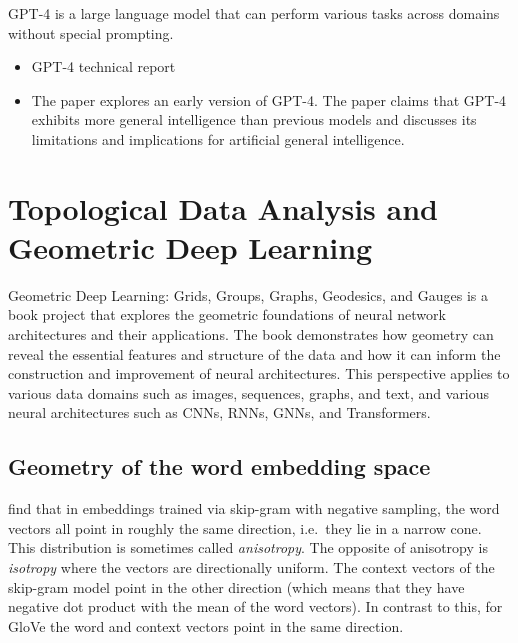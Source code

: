 \documentclass[11pt, a4paper]{amsart}
\begin{document}
GPT-4 is a large language model that can perform various tasks across domains without special prompting.

\begin{itemize}
	\item GPT-4 technical report \cite{openai2023gpt4}
	\item The paper \cite{bubeck2023sparks} explores an early version of GPT-4.
	The paper claims that GPT-4 exhibits more general intelligence than previous models and discusses its limitations and implications for artificial general intelligence.
\end{itemize}


\section{Topological Data Analysis and Geometric Deep Learning}

Geometric Deep Learning: Grids, Groups, Graphs, Geodesics, and Gauges is a book project \cite{bronstein2021geometric} that explores the geometric foundations of neural network architectures and their applications.
The book demonstrates how geometry can reveal the essential features and structure of the data and how it can inform the construction and improvement of neural architectures.
This perspective applies to various data domains such as images, sequences, graphs, and text, and various neural architectures such as CNNs, RNNs, GNNs, and Transformers.


\subsection{Geometry of the word embedding space}

\cite{mimno-thompson-2017-strange} find that in embeddings trained via skip-gram with negative sampling, the word vectors all point in roughly the same direction, i.e.\ they lie in a narrow cone.
This distribution is sometimes called \emph{anisotropy}.
The opposite of anisotropy is \emph{isotropy} where the vectors are directionally uniform.
The context vectors of the skip-gram model point in the other direction (which means that they have negative dot product with the mean of the word vectors).
In contrast to this, for GloVe the word and context vectors point in the same direction.
\end{document}
